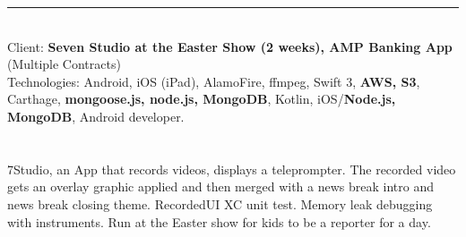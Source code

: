 \documentclass{article}
\begin{document}

\noindent\hfil\rule{0.5\textwidth}{.4pt}\hfil
\\


Client: 	\textbf  { Seven Studio at the Easter Show (2 weeks),  AMP Banking App} (Multiple Contracts)  \\
Technologies: 	Android, iOS (iPad), AlamoFire, ffmpeg, Swift 3, \textbf{AWS, S3}, Carthage, \textbf{mongoose.js, node.js, MongoDB}, Kotlin, 
 		iOS/\textbf{Node.js, MongoDB}, Android developer.  \\
	\\ 
\\
7Studio, an App that records videos, displays a teleprompter. The recorded video gets an overlay graphic applied and then merged with a news break intro and news break closing theme. RecordedUI XC unit test. Memory leak debugging with instruments. Run at the Easter show for kids to be a reporter for a day. \\
\\
\end{document}
